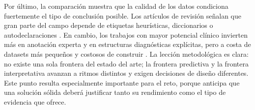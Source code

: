 Por último, la comparación muestra que la calidad de los datos condiciona fuertemente el tipo de conclusión posible. Los artículos de revisión señalan que gran parte del campo depende de etiquetas heurísticas, diccionarios o autodeclaraciones \citep{montejo2024survey, abdulsalam2024suicidal}. En cambio, los trabajos con mayor potencial clínico invierten más en anotación experta y en estructuras diagnósticas explícitas, pero a costa de datasets más pequeños y costosos de construir \citep{gaur2019severity, bao2025redsm5}. La lección metodológica es clara: no existe una sola frontera del estado del arte; la frontera predictiva y la frontera interpretativa avanzan a ritmos distintos y exigen decisiones de diseño diferentes. Este punto resulta especialmente importante para el reto, porque anticipa que una solución sólida deberá justificar tanto su rendimiento como el tipo de evidencia que ofrece.
